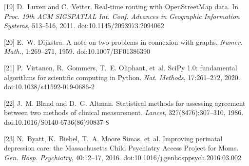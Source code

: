 \documentclass{article}
\begin{document}
[19] D.~Luxen and C.~Vetter. Real-time routing with OpenStreetMap data. In \emph{Proc. 19th ACM SIGSPATIAL Int. Conf. Advances in Geographic Information Systems}, 513--516, 2011. doi:10.1145/2093973.2094062

[20] E.~W. Dijkstra. A note on two problems in connexion with graphs. \emph{Numer. Math.}, 1:269--271, 1959. doi:10.1007/BF01386390

[21] P.~Virtanen, R.~Gommers, T.~E. Oliphant, et~al. SciPy 1.0: fundamental algorithms for scientific computing in Python. \emph{Nat. Methods}, 17:261--272, 2020. doi:10.1038/s41592-019-0686-2

[22] J.~M. Bland and D.~G. Altman. Statistical methods for assessing agreement between two methods of clinical measurement. \emph{Lancet}, 327(8476):307--310, 1986. doi:10.1016/S0140-6736(86)90837-8

[23] N.~Byatt, K.~Biebel, T.~A. Moore Simas, et~al. Improving perinatal depression care: the Massachusetts Child Psychiatry Access Project for Moms. \emph{Gen. Hosp. Psychiatry}, 40:12--17, 2016. doi:10.1016/j.genhosppsych.2016.03.002
\end{document}
